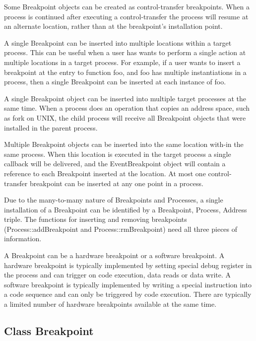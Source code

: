 \documentclass{article}
\begin{document}
  Some Breakpoint objects can be created as control-transfer
  breakpoints. When a process is
  continued after executing a control-transfer the process will resume at an
  alternate location, rather than at the breakpoint's
  installation point.

  A single Breakpoint can be inserted into multiple locations within a target
  process. This can be useful when a user has wants to perform a single action
  at multiple locations in a target process. For example, if a user wants to
  insert a breakpoint at the entry to function foo, and foo has multiple
  instantiations in a process, then a single Breakpoint can be inserted at each
  instance of foo.

  A single Breakpoint object can be inserted into multiple target processes at the
  same time. When a process does an operation that copies an address space,
  such as fork on UNIX, the child process will receive all Breakpoint objects
  that were installed in the parent process.

  Multiple Breakpoint objects can be inserted into the same location with-in the
  same process. When this location is executed in the target process a single
  callback will be delivered, and the EventBreakpoint object will contain a
  reference to each Breakpoint inserted at the location. At most one
  control-transfer breakpoint can be inserted at any one point in a process.

  Due to the many-to-many nature of Breakpoints and Processes, a single
  installation of a Breakpoint can be identified by a Breakpoint, Process,
  Address triple. The functions for inserting and removing breakpoints
  (Process::addBreakpoint and Process::rmBreakpoint) need all three pieces of
  information.

  A Breakpoint can be a hardware breakpoint or
  a software breakpoint. A hardware
  breakpoint is typically implemented by setting special debug register in the
  process and can trigger on code execution, data reads or data write. A
  software breakpoint is typically implemented by writing a special instruction
  into a code sequence and can only be triggered by code execution. There are
  typically a limited number of hardware breakpoints available at the same time.

  \subsection{Class Breakpoint}
    
\end{document}
